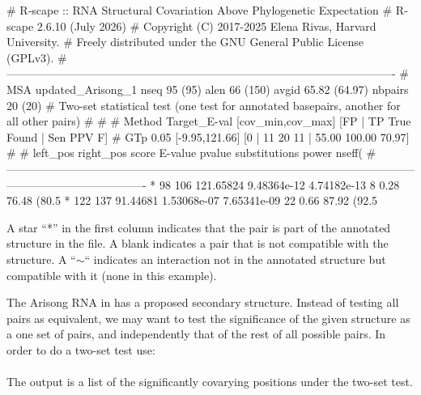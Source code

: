 \begin{sreoutput}
# R-scape :: RNA Structural Covariation Above Phylogenetic Expectation
# R-scape 2.6.10 (July 2026)
# Copyright (C) 2017-2025 Elena Rivas, Harvard University.
# Freely distributed under the GNU General Public License (GPLv3).
#-------------------------------------------------------------------------------------------------------
# MSA updated_Arisong_1 nseq 95 (95) alen 66 (150) avgid 65.82 (64.97) nbpairs 20 (20)
# Two-set statistical test (one test for annotated basepairs, another for all other pairs)
#
#
# Method Target_E-val [cov_min,cov_max] [FP | TP True Found | Sen PPV F] 
# GTp    0.05         [-9.95,121.66]     [0 | 11 20 11 | 55.00 100.00 70.97] 
#
#  left_pos    right_pos   score       E-value        pvalue       substitutions    power   nseff(%
#-------------------------------------------------------------------------------------------------------------------------------------------------
*        98          106   121.65824   9.48364e-12    4.74182e-13   8               0.28    76.48 (80.5%
*       122          137   91.44681    1.53068e-07    7.65341e-09   22              0.66    87.92 (92.5%
\end{sreoutput}
A star ``*'' in the first column indicates that the pair is part of
the annotated structure in the  file. A
blank indicates a pair that is not compatible with the structure. A
``$\sim$`` indicates an interaction not in the annotated structure but
compatible with it (none in this example).

The Arisong RNA in  has a proposed
secondary structure.  Instead of testing all pairs as equivalent, we
may want to test the significance of the given structure as a one set
of pairs, and independently that of the rest of all possible pairs.
In order to do a two-set test use:\\

\\

\noindent
The output is a list of the significantly covarying positions under the two-set test.


